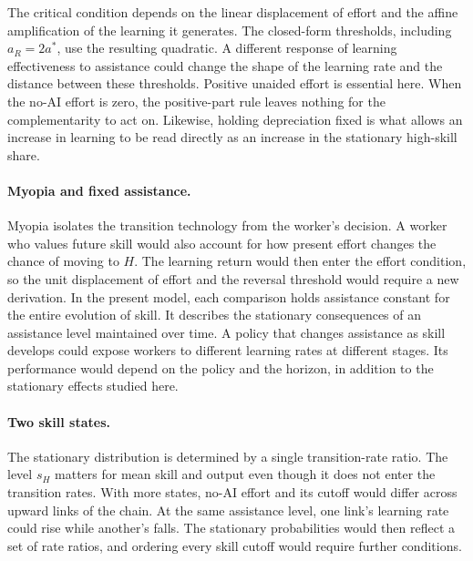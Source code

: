 \documentclass[11pt]{article}
\theoremstyle{definition}
\begin{document}
The critical condition depends on the linear displacement of effort and
the affine amplification of the learning it generates. The closed-form
thresholds, including $a_R=2a^*$, use the resulting quadratic. A different
response of learning effectiveness to assistance could change the shape
of the learning rate and the distance between these thresholds. Positive
unaided effort is essential here. When the no-AI effort is zero, the
positive-part rule leaves nothing for the complementarity to act on.
Likewise, holding depreciation fixed is what allows an increase in
learning to be read directly as an increase in the stationary high-skill
share.

\paragraph{Myopia and fixed assistance.}
Myopia isolates the transition technology from the worker's decision.
A worker who values future skill would also account for how present effort
changes the chance of moving to $H$. The learning return would then enter
the effort condition, so the unit displacement of effort and the reversal
threshold would require a new derivation. In the present model, each
comparison holds assistance constant for the entire evolution of skill.
It describes the stationary consequences of an assistance level maintained
over time. A policy that changes assistance as skill develops could expose
workers to different learning rates at different stages. Its performance
would depend on the policy and the horizon, in addition to the stationary
effects studied here.

\paragraph{Two skill states.}
The stationary distribution is determined by a single transition-rate
ratio. The level $s_H$ matters for mean skill and output even though it
does not enter the transition rates. With more states, no-AI effort and
its cutoff would differ across upward links of the chain. At the same
assistance level, one link's learning rate could rise while another's
falls. The stationary probabilities would then reflect a set of rate
ratios, and ordering every skill cutoff would require further conditions.
\end{document}
